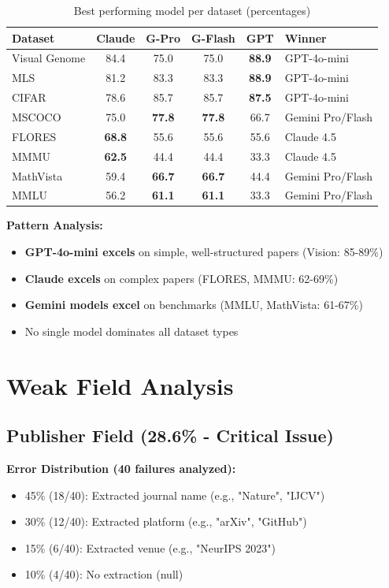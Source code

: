 \documentclass[11pt,a4paper]{article}
\begin{document}
\begin{table}[h]
\centering
\begin{tabular}{lccccp{3cm}}
\toprule
\textbf{Dataset} & \textbf{Claude} & \textbf{G-Pro} & \textbf{G-Flash} & \textbf{GPT} & \textbf{Winner} \\
\midrule
Visual Genome & 84.4 & 75.0 & 75.0 & \textbf{88.9} & GPT-4o-mini \\
MLS & 81.2 & 83.3 & 83.3 & \textbf{88.9} & GPT-4o-mini \\
CIFAR & 78.6 & 85.7 & 85.7 & \textbf{87.5} & GPT-4o-mini \\
MSCOCO & 75.0 & \textbf{77.8} & \textbf{77.8} & 66.7 & Gemini Pro/Flash \\
FLORES & \textbf{68.8} & 55.6 & 55.6 & 55.6 & Claude 4.5 \\
MMMU & \textbf{62.5} & 44.4 & 44.4 & 33.3 & Claude 4.5 \\
MathVista & 59.4 & \textbf{66.7} & \textbf{66.7} & 44.4 & Gemini Pro/Flash \\
MMLU & 56.2 & \textbf{61.1} & \textbf{61.1} & 33.3 & Gemini Pro/Flash \\
\bottomrule
\end{tabular}
\caption{Best performing model per dataset (percentages)}
\end{table}

\textbf{Pattern Analysis:}
\begin{itemize}
    \item \textbf{GPT-4o-mini excels} on simple, well-structured papers (Vision: 85-89\%)
    \item \textbf{Claude excels} on complex papers (FLORES, MMMU: 62-69\%)
    \item \textbf{Gemini models excel} on benchmarks (MMLU, MathVista: 61-67\%)
    \item No single model dominates all dataset types
\end{itemize}

\section{Weak Field Analysis}

\subsection{Publisher Field (28.6\% - Critical Issue)}

\textbf{Error Distribution (40 failures analyzed):}
\begin{itemize}
    \item 45\% (18/40): Extracted journal name (e.g., "Nature", "IJCV")
    \item 30\% (12/40): Extracted platform (e.g., "arXiv", "GitHub")
    \item 15\% (6/40): Extracted venue (e.g., "NeurIPS 2023")
    \item 10\% (4/40): No extraction (null)
\end{itemize}
\end{document}
